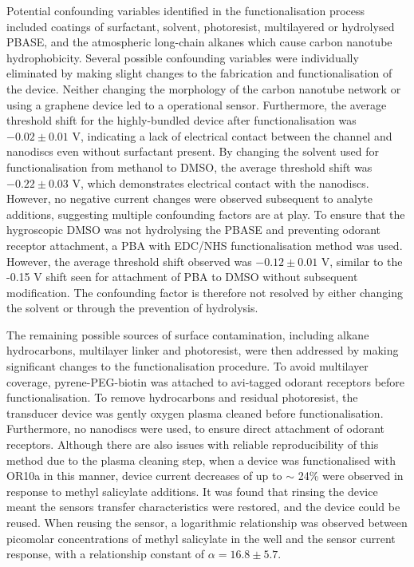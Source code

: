 \documentclass[
  a4paper,
]{scrbook}
\begin{document}
Potential confounding variables identified in the functionalisation
process included coatings of surfactant, solvent, photoresist,
multilayered or hydrolysed PBASE, and the atmospheric long-chain alkanes
which cause carbon nanotube hydrophobicity. Several possible confounding
variables were individually eliminated by making slight changes to the
fabrication and functionalisation of the device. Neither changing the
morphology of the carbon nanotube network or using a graphene device led
to a operational sensor. Furthermore, the average threshold shift for
the highly-bundled device after functionalisation was \(−0.02\pm0.01\)
V, indicating a lack of electrical contact between the channel and
nanodiscs even without surfactant present. By changing the solvent used
for functionalisation from methanol to DMSO, the average threshold shift
was \(−0.22\pm0.03\) V, which demonstrates electrical contact with the
nanodiscs. However, no negative current changes were observed subsequent
to analyte additions, suggesting multiple confounding factors are at
play. To ensure that the hygroscopic DMSO was not hydrolysing the PBASE
and preventing odorant receptor attachment, a PBA with EDC/NHS
functionalisation method was used. However, the average threshold shift
observed was \(-0.12\pm0.01\) V, similar to the -0.15 V shift seen for
attachment of PBA to DMSO without subsequent modification. The
confounding factor is therefore not resolved by either changing the
solvent or through the prevention of hydrolysis.

The remaining possible sources of surface contamination, including
alkane hydrocarbons, multilayer linker and photoresist, were then
addressed by making significant changes to the functionalisation
procedure. To avoid multilayer coverage, pyrene-PEG-biotin was attached
to avi-tagged odorant receptors before functionalisation. To remove
hydrocarbons and residual photoresist, the transducer device was gently
oxygen plasma cleaned before functionalisation. Furthermore, no
nanodiscs were used, to ensure direct attachment of odorant receptors.
Although there are also issues with reliable reproducibility of this
method due to the plasma cleaning step, when a device was functionalised
with OR10a in this manner, device current decreases of up to \(\sim\)
24\% were observed in response to methyl salicylate additions. It was
found that rinsing the device meant the sensors transfer characteristics
were restored, and the device could be reused. When reusing the sensor,
a logarithmic relationship was observed between picomolar concentrations
of methyl salicylate in the well and the sensor current response, with a
relationship constant of \(\alpha = 16.8\pm5.7\).
\end{document}
